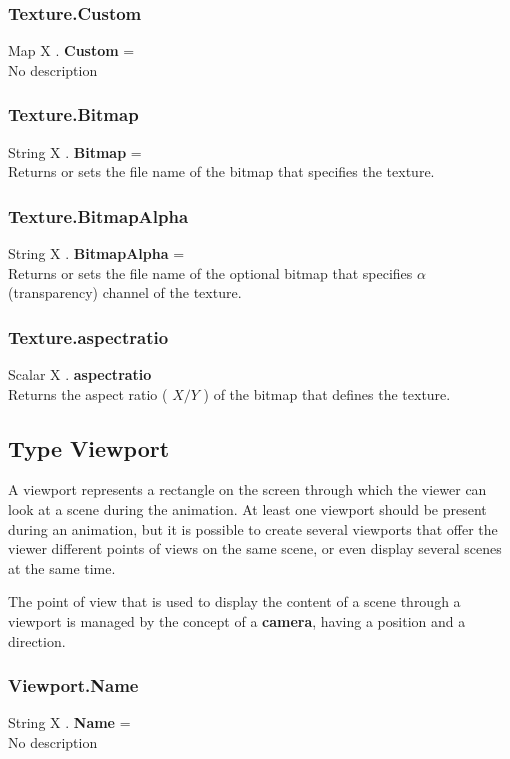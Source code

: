 \subsubsection{Texture.Custom \label{F:Texture:Custom}}
Map X . \textbf{Custom} = \\
No description

\subsubsection{Texture.Bitmap \label{F:Texture:Bitmap}}
String X . \textbf{Bitmap} = \\
Returns or sets the file name of the bitmap that specifies the texture.

\subsubsection{Texture.BitmapAlpha \label{F:Texture:BitmapAlpha}}
String X . \textbf{BitmapAlpha} = \\
Returns or sets the file name of the optional bitmap that specifies $\alpha$ (transparency) channel of the texture.

\subsubsection{Texture.aspectratio \label{F:Texture:aspectratio}}
Scalar X . \textbf{aspectratio} \\
Returns the aspect ratio ( $X/Y$ ) of the bitmap that defines the texture.

\subsection{Type Viewport \label{T:Viewport}}
A viewport represents a rectangle on the screen through which the viewer can look at a scene during the animation. At least one viewport should be present during an animation, but it is possible to create several viewports that offer the viewer different points of views on the same scene, or even display several scenes at the same time.

The point of view that is used to display the content of a scene through a viewport is managed by the concept of a \textbf{camera}, having a position and a direction.

\subsubsection{Viewport.Name \label{F:Viewport:Name}}
String X . \textbf{Name} = \\
No description

